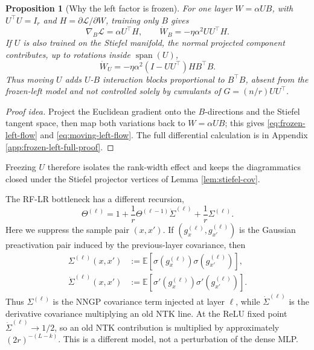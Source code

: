 \documentclass{article}
\newtheorem{proposition}[theorem]{Proposition}
\newcommand{\E}{\mathbb E}
\begin{document}
\begin{proposition}[Why the left factor is frozen]
\label{prop:frozen-left}
For one layer \(W=\alpha UB\), with \(U^\top U=I_r\) and \(H=\partial \mathcal L/\partial W\), training only \(B\) gives
\begin{equation}
\nabla_B\mathcal L=\alpha U^\top H,
\qquad
\dot W_B=-\eta\alpha^2UU^\top H.
\label{eq:frozen-left-flow}
\end{equation}
If \(U\) is also trained on the Stiefel manifold, the normal projected component contributes, up to rotations inside \(\operatorname{span}(U)\),
\begin{equation}
\dot W_U
=-\eta\alpha^2 (I-UU^\top)H B^\top B.
\label{eq:moving-left-flow}
\end{equation}
Thus moving \(U\) adds \(U\)-\(B\) interaction blocks proportional to \(B^\top B\), absent from the frozen-left model and not controlled solely by cumulants of \(G=(n/r)UU^\top\).
\end{proposition}

\begin{proof}[Proof idea]
Project the Euclidean gradient onto the \(B\)-directions and the Stiefel tangent space, then map both variations back to \(W=\alpha UB\); this gives \eqref{eq:frozen-left-flow} and \eqref{eq:moving-left-flow}. The full differential calculation is in Appendix \ref{app:frozen-left-full-proof}.
\end{proof}

Freezing \(U\) therefore isolates the rank-width effect and keeps the diagrammatics closed under the Stiefel projector vertices of Lemma \ref{lem:stiefel-cov}.

The RF-LR bottleneck has a different recursion,
\begin{equation}
\Theta^{(\ell)}=1+\frac1r\Theta^{(\ell-1)}\dot\Sigma^{(\ell)}+\frac1r\Sigma^{(\ell)}.
\label{eq:rflr-recursion}
\end{equation}
Here we suppress the sample pair \((x,x')\). If \((g_x^{(\ell)},g_{x'}^{(\ell)})\) is the Gaussian preactivation pair induced by the previous-layer covariance, then
\begin{equation}
\begin{aligned}
\Sigma^{(\ell)}(x,x')
&:=\E[\sigma(g_x^{(\ell)})\sigma(g_{x'}^{(\ell)})],\\
\dot\Sigma^{(\ell)}(x,x')
&:=\E[\sigma'(g_x^{(\ell)})\sigma'(g_{x'}^{(\ell)})].
\end{aligned}
\label{eq:rflr-sigma-definitions}
\end{equation}
Thus \(\Sigma^{(\ell)}\) is the NNGP covariance term injected at layer \(\ell\), while \(\dot\Sigma^{(\ell)}\) is the derivative covariance multiplying an old NTK line. At the ReLU fixed point \(\dot\Sigma^{(\ell)}\to1/2\), so an old NTK contribution is multiplied by approximately \((2r)^{-(L-k)}\). This is a different model, not a perturbation of the dense MLP.
\end{document}
